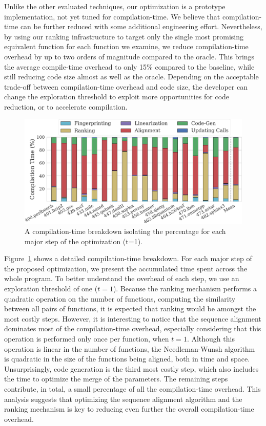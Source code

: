 Unlike the other evaluated techniques, our optimization is a prototype implementation, not yet tuned for compilation-time. We believe that
compilation-time can be further reduced with some additional engineering effort. Nevertheless, by using our ranking infrastructure to
target only the single most promising equivalent function for each function we examine, we reduce compilation-time overhead by up to two
orders of magnitude compared to the oracle. This brings the average compile-time overhead to only 15\% compared to the baseline, while
still reducing code size almost as well as the oracle. Depending on the acceptable trade-off between compilation-time overhead and code
size, the developer can change the exploration threshold to exploit more opportunities for code reduction, or to accelerate compilation.

\begin{figure}[h]
  \centering
  \includegraphics[width=1.0\linewidth]{src/merging-optimisation/figs/compilation-time-breakdown-sqrd.pdf}
  \caption{A compilation-time breakdown isolating the percentage for each major
           step of the optimization (t=1).}%
  \label{fig:compilation-time-breakdown}
\end{figure}


Figure~\ref{fig:compilation-time-breakdown} shows a detailed compilation-time breakdown. For each major step of the proposed optimization,
we present the accumulated time spent across the whole program. To better understand the overhead of each step, we use an exploration threshold of one ($t = 1$). Because the ranking mechanism performs a quadratic operation on the number of functions, computing
the similarity between all pairs of functions, it is expected that ranking would be amongst the most costly steps. However, it is
interesting to notice that the sequence alignment dominates most of the compilation-time overhead, especially considering that this
operation is performed only once per function, when $t = 1$. Although this operation is linear in the number of functions, the
Needleman-Wunsh algorithm~\cite{needleman70} is quadratic in the size of the functions being aligned, both in time and space.
Unsurprisingly, code generation is the third most costly step, which also includes the time to optimize the merge of the parameters. The
remaining steps contribute, in total, a small percentage of all the compilation-time overhead. This analysis suggests that optimizing the
sequence alignment algorithm and the ranking mechanism is key to reducing even further the overall compilation-time overhead.

